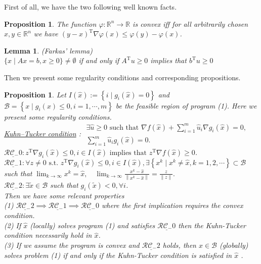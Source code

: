 \documentclass{article}
\theoremstyle{plain}
\newtheorem{lemma}[theorem]{Lemma}
\newtheorem{proposition}[theorem]{Proposition}
\theoremstyle{definition}
\begin{document}
First of all, we have the two following well known facts.
\begin{proposition}
The function  $\varphi: \mathbb{R}^{n} \longrightarrow \mathbb{R}$  is convex iff for all arbitrarily chosen  $x, y \in \mathbb{R}^{n}$  we have
$(y-x)^{\mathrm{T}} \nabla \varphi(x) \leq \varphi(y)-\varphi(x) $.
\end{proposition}

\begin{lemma} (Farkas’ lemma)\\
$\{x \mid A x=b, x \geq 0\} \neq \emptyset$ if and only if  $A^{\mathrm{T}} u \geq 0$  implies that  $b^{\mathrm{T}} u \geq 0 $
\end{lemma}

Then we present some regularity conditions and corresponding propositions.
\begin{proposition} Let  $ I(\hat{x}):=\left\{i \mid g_{i}(\hat{x})=0\right\}$ and $\mathcal{B}=\left\{x \mid g_{i}(x) \leq 0, i=1, \cdots, m\right\}$ be the feasible region of program (1). Here we present some regularity conditions.\\
\indent  \underline{Kuhn–Tucker condition} : $\begin{array}{r}
\exists \hat{u} \geq 0 \text { such that } \nabla f(\hat{x})+\sum_{i=1}^{m} \hat{u}_{i} \nabla g_{i}(\hat{x})=0, \\
\sum_{i=1}^{m} \hat{u}_{i} g_{i}(\hat{x})=0 .
\end{array}$ \\
\indent  $\underline{\mathcal{R C}_{-} 0} : z^{\mathrm{T}} \nabla g_{i}(\hat{x}) \leq 0, i \in I(\hat{x}) \text { implies that } z^{\mathrm{T}} \nabla f(\hat{x}) \geq 0$. \\
\indent  $ \underline{\mathcal{R C}_{-} 1}:  \forall z \neq 0 \text { s.t. } z^{\mathrm{T}} \nabla g_{i}(\hat{x}) \leq 0, i \in I(\hat{x}), \exists\left\{x^{k} \mid x^{k} \neq \hat{x}, k=1,2, \cdots\right\} \subset \mathcal{B}$ such that $\lim _{k \rightarrow \infty} x^{k}=\hat{x}, \quad \lim _{k \rightarrow \infty} \frac{x^{k}-\hat{x}}{\left\|x^{k}-\hat{x}\right\|}=\frac{z}{\|z\|} .$ \\
\indent  $\underline{\mathcal{R} \mathcal{C}_{-} 2}: \exists \tilde{x} \in \mathcal{B}$  such that  $g_{i}(\tilde{x})<0, \forall i $. \\

Then we have  some relevant properties\\
\indent (1) $\underline{\mathcal{RC}_{-} 2} \implies \underline{\mathcal{RC}_{-} 1} \implies \underline{\mathcal{RC}_{-} 0} $ where the first implication requires the convex condition. \\
\indent (2) If  $\hat{x}$  (locally) solves program (1) and satisfies  $\underline{\mathcal{R} \mathcal{C}_{-} 0}$  then the Kuhn-Tucker condition necessarily hold in  $\hat{x}$. \\
\indent (3) If we assume the program is convex and $\underline{\mathcal{R} \mathcal{C}_{-} 2}$  holds, then  $\hat{x} \in \mathcal{B}$  (globally) solves problem (1) if and only if the Kuhn-Tucker condition is satisfied in $\hat{x}$ .
\end{proposition}
\end{document}
